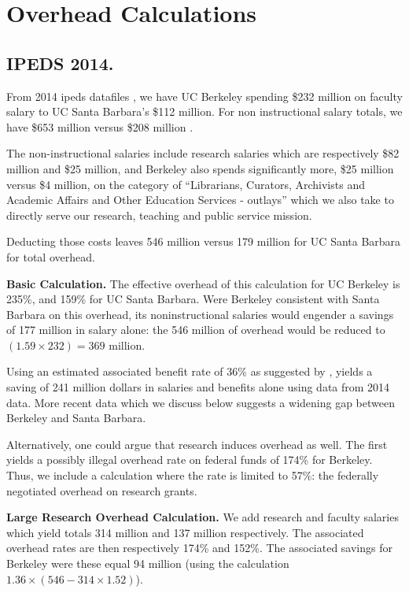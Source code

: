 \documentclass{article}
\begin{document}
\section{Overhead Calculations}

\subsection{IPEDS 2014.}

From 2014 ipeds datafiles \cite{ipeds-is}, we have UC
Berkeley spending \$232 million on faculty salary to UC Santa
Barbara's \$112 million.  For non instructional salary totals,
we have \$653 million versus \$208 million \cite{ipeds-nis}. 

The non-instructional salaries include research salaries which are
respectively \$82 million and \$25 million, and Berkeley also spends
significantly more, \$25 million versus \$4 million, on the category
of ``Librarians, Curators, Archivists and Academic Affairs and Other
Education Services - outlays'' which we also take to directly serve
our research, teaching and public service mission.

Deducting those costs leaves 546 million versus 179 million for UC
Santa Barbara for total overhead.

{\bf Basic Calculation.} The effective overhead of this calculation
for UC Berkeley is 235\%, and 159\% for UC Santa Barbara.  Were
Berkeley consistent with Santa Barbara on this overhead, its
noninstructional salaries would engender a savings of 177 million in
salary alone: the 546 million of overhead would be reduced to $(1.59
\times 232) = 369$ million.

Using an estimated associated benefit rate of 36\% as suggested by
\cite{rev-trends},  yields a saving of 241 million dollars in
salaries and benefits alone using data from 2014 data.  More recent
data which we discuss below suggests a widening gap between Berkeley
and Santa Barbara.

Alternatively, one could argue that research induces overhead as well.
The first yields a possibly illegal overhead rate on federal funds of
174\% for Berkeley.  Thus, we include a calculation where the rate is
limited to 57\%: the federally negotiated overhead on research grants.

{\bf Large Research Overhead Calculation.} We add research and faculty
salaries which yield totals 314 million and 137 million
respectively. The associated overhead rates are then respectively
174\% and 152\%.  The associated savings for Berkeley were these equal
94 million (using the calculation $1.36\times (546 - 314\times1.52)$).
\end{document}
